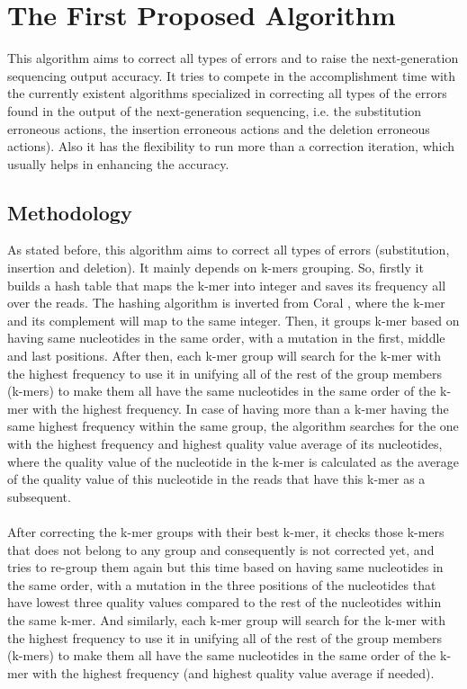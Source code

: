 \documentclass[12pt]{llncs}
\begin{document}
\newpage
\chapter{\label{chap:4}The First Proposed Algorithm}
This algorithm aims to correct all types of errors and to raise the next-generation sequencing output accuracy. It tries to compete in the accomplishment time with the currently existent algorithms specialized in correcting all types of the errors found in the output of the next-generation sequencing, i.e. the substitution erroneous actions, the insertion erroneous actions and the deletion erroneous actions). Also it has the flexibility to run more than a correction iteration, which usually helps in enhancing the accuracy.
\section{Methodology}
As stated before, this algorithm aims to correct all types of errors (substitution, insertion and deletion). It mainly depends on k-mers grouping. So, firstly it builds a hash table that maps the k-mer into integer and saves its frequency all over the reads. The hashing algorithm is inverted from Coral \cite{Coral}, where the k-mer and its complement will map to the same integer. Then, it groups k-mer based on having same nucleotides in the same order, with a mutation in the first, middle and last positions. After then, each k-mer group will search for the k-mer with the highest frequency to use it in unifying all of the rest of the group members (k-mers) to make them all have the same nucleotides in the same order of the k-mer with the highest frequency. In case of having more than a k-mer having the same highest frequency within the same group, the algorithm searches for the one with the highest frequency and highest quality value average of its nucleotides, where the quality value of the nucleotide in the k-mer is calculated as the average of the quality value of this nucleotide in the reads that have this k-mer as a subsequent. 
\\
\\
After correcting the k-mer groups with their best k-mer, it checks those k-mers that does not belong to any group and consequently is not corrected yet, and tries to re-group them again but this time based on having same nucleotides in the same order, with a mutation in the three positions of the nucleotides that have lowest three quality values compared to the rest of the nucleotides within the same k-mer. And similarly, each k-mer group will search for the k-mer with the highest frequency to use it in unifying all of the rest of the group members (k-mers) to make them all have the same nucleotides in the same order of the k-mer with the highest frequency (and highest quality value average if needed).
\end{document}
